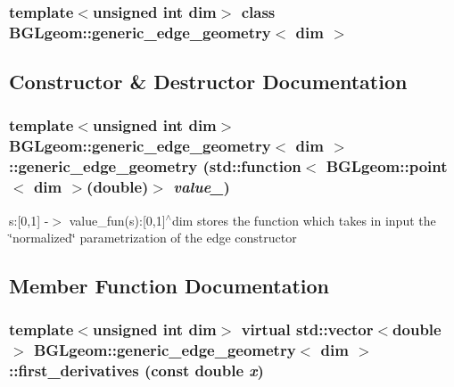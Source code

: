 \subsubsection*{template$<$unsigned int dim$>$ class BGLgeom::generic\_\-edge\_\-geometry$<$ dim $>$}



\subsection{Constructor \& Destructor Documentation}
\hypertarget{classBGLgeom_1_1generic__edge__geometry_abc3ee901035797edb931ca75f3dbbdcf}{
\subsubsection[{generic\_\-edge\_\-geometry}]{\setlength{\rightskip}{0pt plus 5cm}template$<$unsigned int dim$>$ {\bf BGLgeom::generic\_\-edge\_\-geometry}$<$ dim $>$::{\bf generic\_\-edge\_\-geometry} (std::function$<$ {\bf BGLgeom::point}$<$ dim $>$(double)$>$ {\em value\_\-})}}
\label{classBGLgeom_1_1generic__edge__geometry_abc3ee901035797edb931ca75f3dbbdcf}


s:\mbox{[}0,1\mbox{]} -\/$>$ value\_\-fun(s):\mbox{[}0,1\mbox{]}$^\wedge$dim stores the function which takes in input the \char`\"{}normalized\char`\"{} parametrization of the edge constructor 

\subsection{Member Function Documentation}
\hypertarget{classBGLgeom_1_1generic__edge__geometry_ad9052ef00b87b9f8ef26a3944ba5e43c}{
\subsubsection[{first\_\-derivatives}]{\setlength{\rightskip}{0pt plus 5cm}template$<$unsigned int dim$>$ virtual std::vector$<$double$>$ {\bf BGLgeom::generic\_\-edge\_\-geometry}$<$ dim $>$::first\_\-derivatives (const double {\em x})}}
\label{classBGLgeom_1_1generic__edge__geometry_ad9052ef00b87b9f8ef26a3944ba5e43c}


